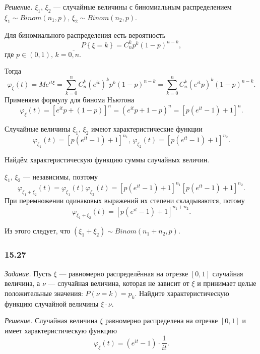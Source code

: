 \textit{Решение.}
$ \xi_1, \, \xi_2$ --- случайные величины с биномиальным распределением $ \xi_1 \sim Binom \left( n_1, p \right), \, \xi_2 \sim Binom \left( n_2, p \right) $.

Для биномиального распределения есть вероятность
$$P \left\{ \xi = k \right\} = C_n^k p^k \left( 1 - p \right)^{n - k},$$
где $p \in \left( 0, 1 \right), \, k = \overline{0, n}$.

Тогда
$$ \varphi_{ \xi } \left( t \right) =
Me^{it \xi } =
\sum \limits_{k = 0}^{n} C_n^k \left( e^{it} \right)^k p^k \left( 1 - p \right)^{n - k} =
\sum \limits_{k = 0}^{n} C_n^k \left( e^{it} p \right)^k \left( 1 - p \right)^{n - k}.$$
Применяем формулу для бинома Ньютона
$$ \varphi_{ \xi } \left( t \right) =
\left[ e^{it} p + \left( 1 - p \right) \right]^n =
\left( e^{it} p + 1 - p \right)^n =
\left[ p \left( e^{it} - 1 \right) + 1 \right]^n.$$

Случайные величины $ \xi_1, \, \xi_2$ имеют характеристические функции
$$ \varphi_{ \xi_1 } \left( t \right) = \left[ p \left( e^{it} - 1 \right) + 1 \right]^{n_1}, \,
\varphi_{ \xi_2 } \left( t \right) = \left[ p \left( e^{it} - 1 \right) + 1 \right]^{n_2}.$$

Найдём характеристическую функцию суммы случайных величин.

$ \xi_1, \, \xi_2$ --- независимы,
поэтому
$$ \varphi_{ \xi_1 + \xi_2} \left( t \right) =
\varphi_{ \xi_1} \left( t \right) \varphi_{ \xi_2} \left( t \right) =
\left[ p \left( e^{it} - 1 \right) + 1 \right]^{n_1} \left[ p \left( e^{it} - 1 \right) + 1 \right]^{n_2}.$$
При перемножении одинаковых выражений их степени складываются, потому
$$ \varphi_{ \xi_1 + \xi_2} \left( t \right) =
\left[ p \left( e^{it} - 1 \right) + 1 \right]^{n_1 + n_2}.$$

Из этого следует, что $ \left( \xi_1 + \xi_2 \right) \sim Binom \left( n_1 + n_2, p \right) $.

\subsubsection*{15.27}

\textit{Задание.}
Пусть $ \xi $ --- равномерно распределённая на отрезке $ \left[ 0, 1 \right] $ случайная величина, а $ \nu $ --- случайная величина,
которая не зависит от $ \xi $ и принимает целые положительные значения: $P \left( \nu = k \right) = p_k$.
Найдите характеристическую функцию случайной величины $ \xi \cdot \nu $.

\textit{Решение.} Случайная величина $ \xi $ равномерно распределена на отрезке $ \left[ 0, 1 \right] $ и имеет характеристическую функцию
$$ \varphi_{ \xi } \left( t \right) =
\left( e^{it} - 1 \right) \cdot \frac{1}{it}.$$


